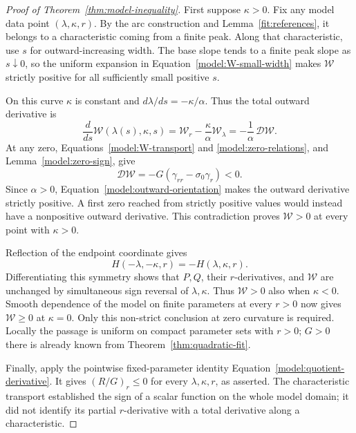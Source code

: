 \begin{proof}[Proof of Theorem~\ref{thm:model-inequality}]
First suppose \(\kappa>0\).  Fix any model data point
\((\lambda,\kappa,r)\).  By the arc construction and
Lemma~\ref{fit:references}, it belongs to a characteristic coming
from a finite peak.  Along that characteristic, use \(s\) for
outward-increasing width.  The base slope tends to a finite peak slope
as \(s\downarrow0\), so the uniform expansion in
Equation~\eqref{model:W-small-width} makes \(\mathcal W\) strictly
positive for all sufficiently small positive \(s\).

On this curve \(\kappa\) is constant and
\(d\lambda/ds=-\kappa/\alpha\).  Thus the total outward derivative is
\begin{equation}
 \frac{d}{ds}\mathcal W(\lambda(s),\kappa,s)
 =\mathcal W_r-\frac{\kappa}{\alpha}\mathcal W_\lambda
 =-\frac1\alpha\,\mathcal D\mathcal W.
 \label{model:outward-orientation}
\end{equation}
At any zero, Equations~\eqref{model:W-transport} and
\eqref{model:zero-relations}, and Lemma~\ref{model:zero-sign}, give
\[
 \mathcal D\mathcal W
 =-G(\gamma_{rr}-\sigma_0\gamma_r)<0.
\]
Since \(\alpha>0\), Equation~\eqref{model:outward-orientation}
makes the outward derivative strictly positive.  A first zero reached
from strictly positive values would instead have a nonpositive
outward derivative.  This contradiction proves
\(\mathcal W>0\) at every point with \(\kappa>0\).

Reflection of the endpoint coordinate gives
\[
 H(-\lambda,-\kappa,r)=-H(\lambda,\kappa,r).
\]
Differentiating this symmetry shows that \(P,Q\), their
\(r\)-derivatives, and \(\mathcal W\) are unchanged by simultaneous
sign reversal of \(\lambda,\kappa\).
Thus \(\mathcal W>0\) also when \(\kappa<0\).
Smooth dependence of the model on finite parameters at every \(r>0\)
now gives \(\mathcal W\ge0\) at \(\kappa=0\).
Only this non-strict conclusion at zero curvature is required.
Locally the passage is uniform on compact parameter sets with \(r>0\);
\(G>0\) there is already known from
Theorem~\ref{thm:quadratic-fit}.

Finally, apply the pointwise fixed-parameter identity
Equation~\eqref{model:quotient-derivative}.
It gives \((R/G)_r\le0\) for every \(\lambda,\kappa,r\), as asserted.
The characteristic transport established the sign of a scalar
function on the whole model domain; it did not identify its partial
\(r\)-derivative with a total derivative along a characteristic.
\end{proof}
